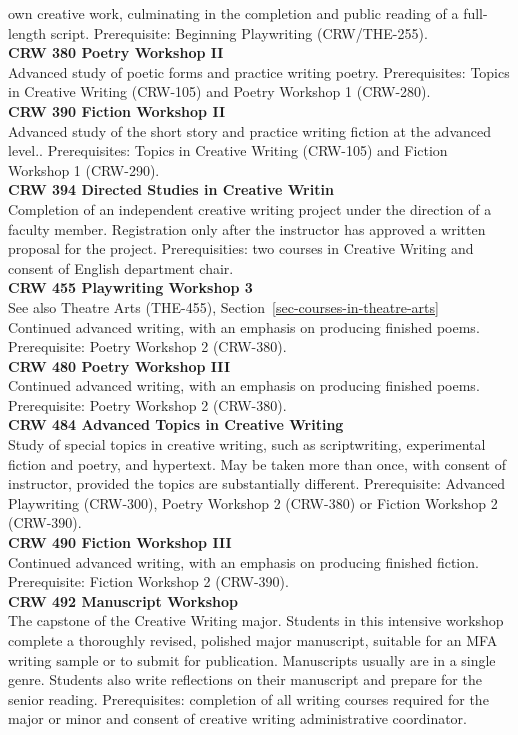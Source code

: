 \documentclass[
  letterpaper,
]{scrbook}
\begin{document}
own creative work, culminating in the completion and public reading of a
full-length script. Prerequisite: Beginning Playwriting (CRW/THE-255).\\
\textbf{CRW 380 Poetry Workshop II}\\
Advanced study of poetic forms and practice writing poetry.
Prerequisites: Topics in Creative Writing (CRW-105) and Poetry Workshop
1 (CRW-280).\\
\textbf{CRW 390 Fiction Workshop II}\\
Advanced study of the short story and practice writing fiction at the
advanced level.. Prerequisites: Topics in Creative Writing (CRW-105) and
Fiction Workshop 1 (CRW-290).\\
\textbf{CRW 394 Directed Studies in Creative Writin}\\
Completion of an independent creative writing project under the
direction of a faculty member. Registration only after the instructor
has approved a written proposal for the project. Prerequisities: two
courses in Creative Writing and consent of English department chair.\\
\textbf{CRW 455 Playwriting Workshop 3}\\
See also Theatre Arts (THE-455),
Section~\ref{sec-courses-in-theatre-arts}\\
Continued advanced writing, with an emphasis on producing finished
poems. Prerequisite: Poetry Workshop 2 (CRW-380).\\
\textbf{CRW 480 Poetry Workshop III}\\
Continued advanced writing, with an emphasis on producing finished
poems. Prerequisite: Poetry Workshop 2 (CRW-380).\\
\textbf{CRW 484 Advanced Topics in Creative Writing}\\
Study of special topics in creative writing, such as scriptwriting,
experimental fiction and poetry, and hypertext. May be taken more than
once, with consent of instructor, provided the topics are substantially
different. Prerequisite: Advanced Playwriting (CRW-300), Poetry Workshop
2 (CRW-380) or Fiction Workshop 2 (CRW-390).\\
\textbf{CRW 490 Fiction Workshop III}\\
Continued advanced writing, with an emphasis on producing finished
fiction. Prerequisite: Fiction Workshop 2 (CRW-390).\\
\textbf{CRW 492 Manuscript Workshop}\\
The capstone of the Creative Writing major. Students in this intensive
workshop complete a thoroughly revised, polished major manuscript,
suitable for an MFA writing sample or to submit for publication.
Manuscripts usually are in a single genre. Students also write
reflections on their manuscript and prepare for the senior reading.
Prerequisites: completion of all writing courses required for the major
or minor and consent of creative writing administrative coordinator.
\end{document}
